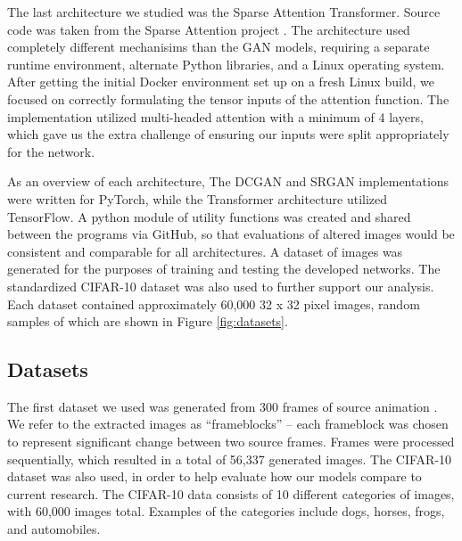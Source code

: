\documentclass[letterpaper]{article} %
\begin{document}
The last architecture we studied was the Sparse Attention Transformer.
Source code was taken from the Sparse Attention project \cite{generative_transformers}.
The architecture used completely different mechanisims than the GAN models,
requiring a separate runtime environment, alternate Python libraries, and a Linux operating system.
After getting the initial Docker environment set up on a fresh Linux build,
we focused on correctly formulating the tensor inputs of the attention function.
The implementation utilized multi-headed attention with a minimum of 4 layers,
which gave us the extra challenge of ensuring our inputs were split appropriately for the network.

As an overview of each architecture,
The DCGAN and SRGAN implementations were written for PyTorch,
while the Transformer architecture utilized TensorFlow.
A python module of utility functions was created and shared between the programs via GitHub,
so that evaluations of altered images would be consistent and comparable for all architectures.
A dataset of images was generated
for the purposes of training and testing the developed networks.
The standardized CIFAR-10 dataset
was also used to further support our analysis.
Each dataset contained approximately 60,000 32 x 32 pixel images,
random samples of which are shown in Figure \ref{fig:datasets}.

\subsection{Datasets}
The first dataset we used was generated from 300 frames of source animation \cite{animation}.
We refer to the extracted images as ``frameblocks'' --
each frameblock was chosen to represent significant change between two source frames.
Frames were processed sequentially, which resulted in a total of 56,337 generated images.
The CIFAR-10 dataset was also used, in order to help evaluate how our models
compare to current research.
The CIFAR-10 data consists of 10 different categories of images, with 60,000 images total.
Examples of the categories include dogs, horses, frogs, and automobiles.
\end{document}

